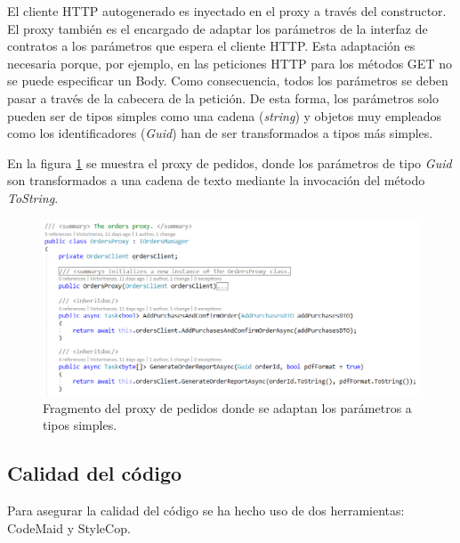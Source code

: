 \documentclass[11pt,spanish,listoffigures]{tfgetsinf}
\begin{document}
El cliente HTTP autogenerado es inyectado en el proxy a través del constructor. El proxy también es el encargado de adaptar los parámetros de la interfaz de contratos a los parámetros que espera el cliente HTTP. Esta adaptación es necesaria porque, por ejemplo, en las peticiones HTTP para los métodos GET no se puede especificar un Body. Como consecuencia, todos los parámetros se deben pasar a través de la cabecera de la petición. De esta forma, los parámetros solo pueden ser de tipos simples como una cadena (\textit{string}) y objetos muy empleados como los identificadores (\textit{Guid}) han de ser transformados a tipos más simples. 

En la figura \ref{fig:OrdersProxy} se muestra el proxy de pedidos, donde los parámetros de tipo \textit{Guid} son transformados a una cadena de texto mediante la invocación del método \textit{ToString}.

\begin{figure}[h]
\centering
\includegraphics[scale=0.7]{OrdersProxy}
\caption{Fragmento del proxy de pedidos donde se adaptan los parámetros a tipos simples.}
\label{fig:OrdersProxy}
\end{figure}

\subsection{Calidad del código}

Para asegurar la calidad del código se ha hecho uso de dos herramientas: CodeMaid y StyleCop.
\end{document}
